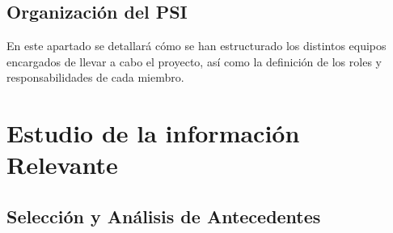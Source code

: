 \subsection{Organización del PSI}En este apartado se detallará cómo se han estructurado los distintos equipos encargados de llevar a cabo el proyecto, así como la definición de los roles y responsabilidades de cada miembro.\\[1ex]

\section{Estudio de la información Relevante}
\subsection{Selección y Análisis de Antecedentes}